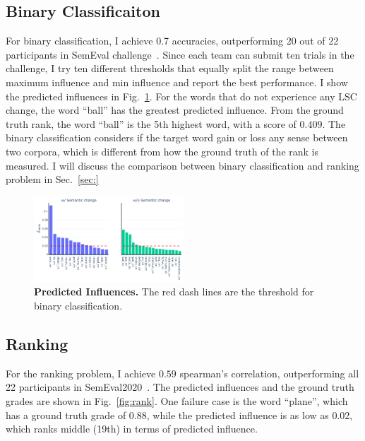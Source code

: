 \subsection{Binary Classificaiton}

For binary classification, I achieve 0.7 accuracies, outperforming 20 out of 22 participants in SemEval challenge~\cite{semeval2020}.
Since each team can submit ten trials in the challenge, I try ten different thresholds that equally split the range between maximum influence and min influence and report the best performance.
I show the predicted influences in Fig.~\ref{fig:binary}.
For the words that do not experience any LSC change, the word ``ball'' has the greatest predicted influence. 
From the ground truth rank, the word ``ball'' is the 5th highest word, with a score of $0.409$.
The binary classification considers if the target word gain or loss any sense between two corpora, which is different from how the ground truth of the rank is measured.
I will discuss the comparison between binary classification and ranking problem in Sec.~\ref{sec:}


\begin{figure}[t]
\centering
\includegraphics[width=0.5\textwidth]{../project/src/influences_binary.pdf}
\caption{\textbf{Predicted Influences.} The red dash lines are the threshold for binary classification.}
\label{fig:binary}
\end{figure}



\subsection{Ranking}


For the ranking problem, I achieve $0.59$ spearman's correlation, outperforming all 22 participants in SemEval2020~\cite{semeval2020}.
The predicted influences and the ground truth grades are shown in Fig.~\ref{fig:rank}.
One failure case is the word ``plane'', which has a ground truth grade of 0.88, while the predicted influence is as low as 0.02, which ranks middle (19th) in terms of predicted influence.




